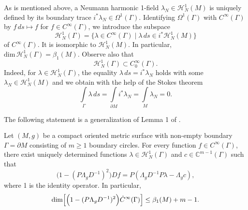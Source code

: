 \documentclass[12pt,reqno]{amsart}
\begin{document}
As is mentioned above,  a Neumann harmonic 1-field $\lambda_N\in{\mathcal H}^1_N(M)$ is uniquely defined by its boundary trace $i^*\lambda_N\in\Omega^1(\Gamma)$. Identifying $\Omega^1(\Gamma)$ with $C^\infty(\Gamma)$ by $f\,ds\mapsto f$ for $f\in C^\infty(\Gamma)$,
we introduce the subspace
\begin{equation}
{\mathcal H}^1_N(\Gamma)=\{\lambda\in C^\infty(\Gamma)\mid \lambda\,ds\in i^*{\mathcal H}^1_N(M)\}
                                \label{2.18}
\end{equation}
of $C^\infty(\Gamma)$. It is isomorphic to ${\mathcal H}^1_N(M)$. In particular,
$
\mbox{dim}\,{\mathcal H}^1_N(\Gamma)=\beta_1(M).
$
Observe also that
\begin{equation}
{\mathcal H}^1_N(\Gamma)\subset C^\infty_0(\Gamma).
                                \label{2.19}
\end{equation}
Indeed, for $\lambda\in{\mathcal H}^1_N(\Gamma)$, the equality $\lambda\,ds=i^*\lambda_N$ holds with some
$\lambda_N\in{\mathcal H}^1_N(M)$ and we obtain with the help of the Stokes theorem
$$
\int\limits_\Gamma\lambda\,ds=\int\limits_{\partial M}i^*\lambda_N
=\int\limits_M\lambda_N=0.
$$

The following statement is a generalization of Lemma 1 of \cite{Be}.

\begin{proposition}
Let $(M,g)$ be a compact oriented metric surface with non-empty boundary $\Gamma=\partial M$ consisting of $m\ge1$ boundary circles.
For every function $f\in C^\infty(\Gamma)$, there exist uniquely determined functions $\lambda\in{\mathcal H}^1_N(\Gamma)$ and
$c\in{\mathbb C}^{m-1}(\Gamma)$ such that
\begin{equation}
\Big(1-(P\Lambda_gD^{-1})^2\Big)Df=P(\Lambda_gD^{-1}P\lambda-\Lambda_gc),
                                \label{2.20}
\end{equation}
where 1 is the identity operator. In particular,
\begin{equation}
\mbox{\rm dim}\Big[\Big(1-(P\Lambda_gD^{-1})^2\Big)\dot C^\infty(\Gamma)\Big]\le \beta_1(M)+m-1.
                                \label{2.21}
\end{equation}
\end{proposition}
\end{document}
